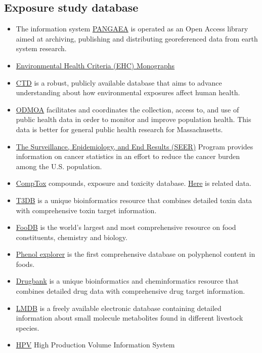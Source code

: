 \documentclass[
]{book}
\begin{document}
\hypertarget{exposure-study-database}{%
\subsection{Exposure study database}\label{exposure-study-database}}

\begin{itemize}
\item
  The information system \href{https://www.pangaea.de}{PANGAEA} is operated as an Open Access library aimed at archiving, publishing and distributing georeferenced data from earth system research.
\item
  \href{http://www.inchem.org/pages/ehc.html}{Environmental Health Criteria (EHC) Monographs}
\item
  \href{http://ctdbase.org/}{CTD} is a robust, publicly available database that aims to advance understanding about how environmental exposures affect human health.
\item
  \href{https://www.mass.gov/orgs/office-of-data-management-and-outcomes-assessment}{ODMOA} facilitates and coordinates the collection, access to, and use of public health data in order to monitor and improve population health. This data is better for general public health research for Massachusetts.
\item
  \href{https://seer.cancer.gov/}{The Surveillance, Epidemiology, and End Results (SEER)} Program provides information on cancer statistics in an effort to reduce the cancer burden among the U.S. population.
\item
  \href{https://comptox.epa.gov/dashboard}{CompTox} compounds, exposure and toxicity database. \href{https://www.epa.gov/chemical-research/downloadable-computational-toxicology-data}{Here} is related data.
\item
  \href{http://www.t3db.ca/}{T3DB} is a unique bioinformatics resource that combines detailed toxin data with comprehensive toxin target information.
\item
  \href{http://foodb.ca/}{FooDB} is the world's largest and most comprehensive resource on food constituents, chemistry and biology.
\item
  \href{http://phenol-explorer.eu}{Phenol explorer} is the first comprehensive database on polyphenol content in foods.
\item
  \href{https://www.drugbank.ca/releases/latest}{Drugbank} is a unique bioinformatics and cheminformatics resource that combines detailed drug data with comprehensive drug target information.
\item
  \href{http://lmdb.ca}{LMDB} is a freely available electronic database containing detailed information about small molecule metabolites found in different livestock species.
\item
  \href{https://iaspub.epa.gov/oppthpv/hpv_hc_characterization.get_report?doctype=2}{HPV} High Production Volume Information System
\end{itemize}

  
\end{document}
